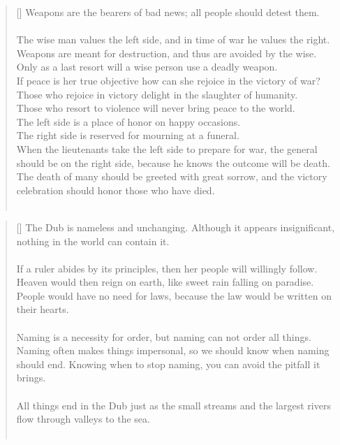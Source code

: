 \documentclass{article}
\begin{document}
\settowidth{\versewidth}{The Wizard leads byemptying people’s minds, filling their bellies, weakening their am- bitions, and making them become strong}
\begin{verse}[\versewidth]
Weapons are the bearers of bad news; all people should detest them.\\
\hfill\\
The wise man values the left side, and in time of war he values the right.\\
Weapons are meant for destruction, and thus are avoided by the wise.\\
Only as a last resort will a wise person use a deadly weapon.\\
If peace is her true objective how can she rejoice in the victory of war?\\
Those who rejoice in victory delight in the slaughter of humanity.\\
Those who resort to violence will never bring peace to the world.\\
The left side is a place of honor on happy occasions.\\
The right side is reserved for mourning at a funeral.\\
When the lieutenants take the left side to prepare for war, the general should be on the right side, because he knows the outcome will be death. 
The death of many should be greeted with great sorrow, and the victory celebration should honor those who have died.\\
\hfill\\
\end{verse}

\settowidth{\versewidth}{The Wizard leads byemptying people’s minds, filling their bellies, weakening their am- bitions, and making them become strong}
\begin{verse}[\versewidth]
The Dub is nameless and unchanging. 
Although it appears insignificant, nothing in the world can contain it.\\
\hfill\\
If a ruler abides by its principles, then her people will willingly follow.\\
Heaven would then reign on earth, like sweet rain falling on paradise.\\
People would have no need for laws, because the law would be written on their hearts.\\
\hfill\\
Naming is a necessity for order, but naming can not order all things.\\
Naming often makes things impersonal, so we should know when naming should end. 
Knowing when to stop naming, you can avoid the pitfall it brings.\\
\hfill\\
All things end in the Dub just as the small streams and the largest rivers flow through valleys to the sea.\\
\hfill\\
\end{verse}
\end{document}
